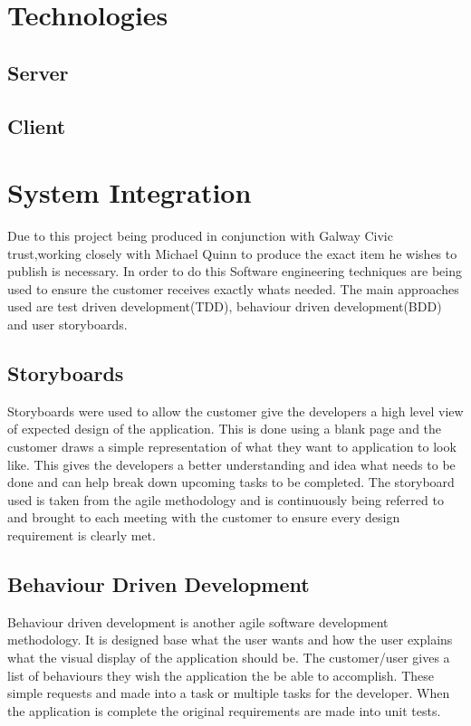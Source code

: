 \section{Technologies}
\subsection{Server}
\subsection{Client}
\section{System Integration}
Due to this project being produced in conjunction with Galway Civic trust,working closely with Michael Quinn to produce the exact item he wishes to publish is necessary. In order to do this Software engineering techniques are being used to ensure the customer receives exactly whats needed. The main approaches used are test driven development(TDD), behaviour driven development(BDD) and user storyboards.

\subsection{Storyboards}

Storyboards were used to allow the customer give the developers a high level view of expected design of the application. This is done using a blank page and the customer draws a simple representation of what they want to application to look like. This gives the developers a better understanding and idea what needs to be done and can help break down upcoming tasks to be completed. The storyboard used is taken from the agile methodology and is continuously being referred to and brought to each meeting with the customer to ensure every design requirement is clearly met. \cite{StoryBoard}

\subsection{Behaviour Driven Development}

Behaviour driven development is another agile software development methodology. It is designed base what the user wants and how the user explains what the visual display of the application should be. The customer/user gives a list of behaviours they wish the application the be able to accomplish. These simple requests and made into a task or multiple tasks for the developer. When the application is complete the original requirements are made into unit tests.\cite{BDD} 

